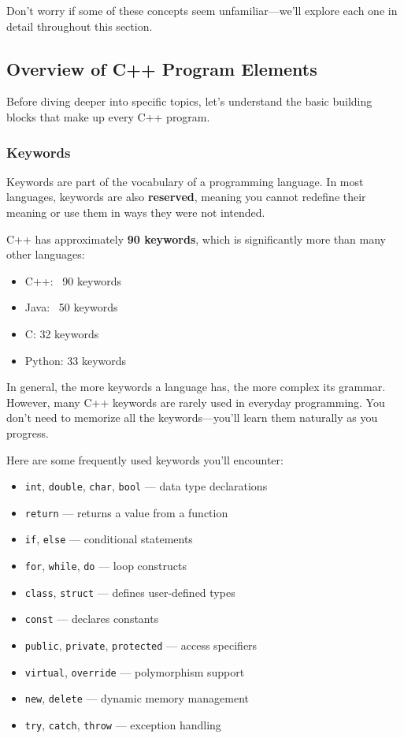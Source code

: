 \begin{remark}
	Don't worry if some of these concepts seem unfamiliar—we'll explore each one in detail throughout this section.
\end{remark}

\subsection{Overview of C++ Program Elements}

Before diving deeper into specific topics, let's understand the basic building blocks that make up every C++ program.

\subsubsection{Keywords}

Keywords are part of the vocabulary of a programming language. In most languages, keywords are also \textbf{reserved}, meaning you cannot redefine their meaning or use them in ways they were not intended.

C++ has approximately \textbf{90 keywords}, which is significantly more than many other languages:
\begin{itemize}
	\item C++: ~90 keywords
	\item Java: ~50 keywords
	\item C: 32 keywords
	\item Python: 33 keywords
\end{itemize}

In general, the more keywords a language has, the more complex its grammar. However, many C++ keywords are rarely used in everyday programming. You don't need to memorize all the keywords—you'll learn them naturally as you progress.

\begin{example}{\leavevmode}
	Here are some frequently used keywords you'll encounter:
	\begin{itemize}
		\item \texttt{int}, \texttt{double}, \texttt{char}, \texttt{bool} — data type declarations
		\item \texttt{return} — returns a value from a function
		\item \texttt{if}, \texttt{else} — conditional statements
		\item \texttt{for}, \texttt{while}, \texttt{do} — loop constructs
		\item \texttt{class}, \texttt{struct} — defines user-defined types
		\item \texttt{const} — declares constants
		\item \texttt{public}, \texttt{private}, \texttt{protected} — access specifiers
		\item \texttt{virtual}, \texttt{override} — polymorphism support
		\item \texttt{new}, \texttt{delete} — dynamic memory management
		\item \texttt{try}, \texttt{catch}, \texttt{throw} — exception handling
	\end{itemize}
\end{example}

